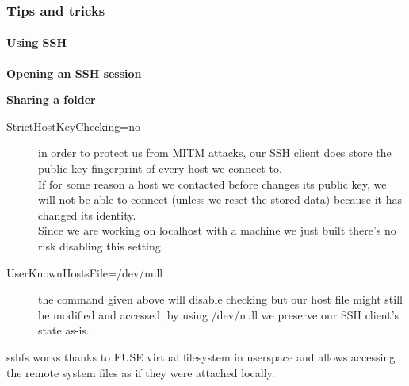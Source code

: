 

\begin{frame}[fragile]
  \frametitle{Tips and tricks}
  \framesubtitle{Using SSH}
  \begin{center}
    \textbf{Opening an SSH session}
  \end{center}
  

  \begin{center}
    \textbf{Sharing a folder}
  \end{center}
  
\end{frame}
 {
  \begin{description}
    \item[StrictHostKeyChecking=no] in order to protect us from MITM attacks,
      our SSH client does store the public key fingerprint of every host we connect to. \\
      If for some reason a host we contacted before changes its public key, we will not be able
      to connect (unless we reset the stored data) because it has changed its identity. \\
      Since we are working on localhost with a machine we just built there's no risk disabling this setting.
    \item[UserKnownHostsFile=/dev/null] the command given above will disable checking but our host file might
      still be modified and accessed, by using /dev/null we preserve our SSH client's state as-is.
  \end{description}
  sshfs works thanks to FUSE virtual filesystem in userspace and allows accessing the remote system files as if they were attached locally.
}


